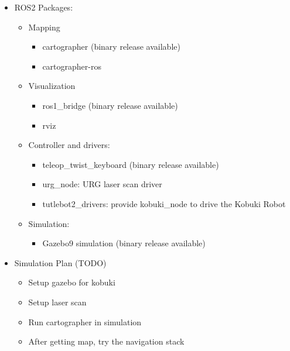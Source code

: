 \documentclass[letterpaper, 10 pt, conference]{ieeeconf}  %
\begin{document}
\begin{itemize}
\item ROS2 Packages:
    \begin{itemize}
        \item Mapping   
            \begin{itemize}
                \item cartographer (binary release available)
                \item cartographer-ros 
            \end{itemize}{}
    \end{itemize}{}
    \begin{itemize}
        \item Visualization
            \begin{itemize}
                \item ros1\_bridge (binary release available)
                \item rviz
            \end{itemize}{}
   
        \item Controller and drivers:
            \begin{itemize}
                \item teleop\_twist\_keyboard (binary release available)
                \item urg\_node: URG laser scan driver 
                \item tutlebot2\_drivers: provide kobuki\_node to drive the Kobuki Robot
            \end{itemize}{}
        \item Simulation:
            \begin{itemize}
                \item Gazebo9 simulation (binary release available)
            \end{itemize}{}
    \end{itemize}{} 
\end{itemize}{}

\begin{itemize}
    \item Simulation Plan (TODO)
        \begin{itemize}
            \item Setup gazebo for kobuki
            \item Setup laser scan
            \item Run cartographer in simulation 
            \item After getting map, try the navigation stack
        \end{itemize}{}
\end{itemize}{}
\end{document}
